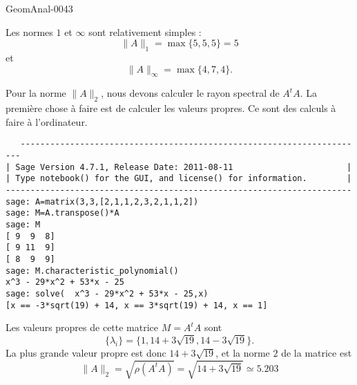 \begin{corrige}{GeomAnal-0043}

    Les normes \( 1\) et \( \infty\) sont relativement simples :
    \begin{equation}
        \| A \|_1=\max\{ 5,5,5 \}=5
    \end{equation}
    et
    \begin{equation}
        \| A \|_{\infty}=\max\{ 4,7,4 \}.
    \end{equation}
    
    Pour la norme \( \| A \|_2\), nous devons calculer le rayon spectral de \( A^tA\). La première chose à faire est de calculer les valeurs propres. Ce sont des calculs à faire à l'ordinateur.
    \begin{verbatim}
   ----------------------------------------------------------------------
| Sage Version 4.7.1, Release Date: 2011-08-11                       |
| Type notebook() for the GUI, and license() for information.        |
----------------------------------------------------------------------
sage: A=matrix(3,3,[2,1,1,2,3,2,1,1,2])
sage: M=A.transpose()*A
sage: M
[ 9  9  8]
[ 9 11  9]
[ 8  9  9]
sage: M.characteristic_polynomial()
x^3 - 29*x^2 + 53*x - 25
sage: solve(  x^3 - 29*x^2 + 53*x - 25,x)
[x == -3*sqrt(19) + 14, x == 3*sqrt(19) + 14, x == 1] 
    \end{verbatim}
Les valeurs propres de cette matrice \( M=A^tA\) sont 
\begin{equation}
    \{ \lambda_i \}=\{ 1,14+3\sqrt{19},14-3\sqrt{19} \}.
\end{equation}
La plus grande valeur propre est donc \( 14+3\sqrt{19}\), et la norme \( 2\) de la matrice est
\begin{equation}
    \| A \|_2=\sqrt{\rho(A^tA)}=\sqrt{14+3\sqrt{19}}\simeq 5.203
\end{equation}
\end{corrige}
